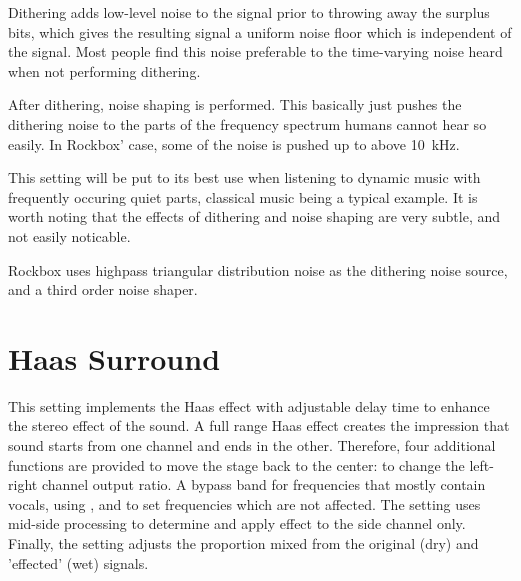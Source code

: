 Dithering adds low-level noise to the signal prior to throwing away the surplus
bits, which gives the resulting signal a uniform noise floor which is
independent of the signal. Most people find this noise preferable to the
time-varying noise heard when not performing dithering.

After dithering, noise shaping is performed. This basically just pushes the
dithering noise to the parts of the frequency spectrum humans cannot hear so
easily. In Rockbox' case, some of the noise is pushed up to above 10~kHz.

This setting will be put to its best use when listening to dynamic music with
frequently occuring quiet parts, classical music being a typical example. It is
worth noting that the effects of dithering and noise shaping are very subtle,
and not easily noticable.

Rockbox uses highpass triangular distribution noise as the dithering noise
source, and a third order noise shaper.


\section{Haas Surround}
This setting implements the Haas effect with adjustable delay time to enhance
the stereo effect of the sound. A full range Haas effect creates the impression
that sound  starts from one channel and ends in the other.  Therefore, four additional
functions are provided to move the stage back to the center:
 to change the left-right channel output ratio.
A bypass band for frequencies that mostly contain vocals, using ,
and  to set frequencies which are not affected. The 
setting uses mid-side processing to determine and apply effect to the side channel only.
Finally, the  setting adjusts the proportion mixed from the
original (dry) and 'effected' (wet) signals.

